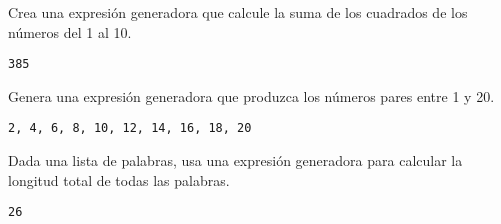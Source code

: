 \begin{exercise} Crea una expresión generadora que calcule la suma de los cuadrados de los números del 1 al 10.

\begin{Shaded}
\begin{Highlighting}[]
\OperatorTok{=} \OperatorTok{**}  \NormalTok{(}\NormalTok{, }\NormalTok{))}
\end{Highlighting}
\end{Shaded}

\begin{verbatim}
385

\end{verbatim}
\end{exercise}

\begin{exercise} Genera una expresión generadora que produzca los números pares entre 1 y 20.
\begin{Shaded}
\begin{Highlighting}[]
\OperatorTok{=} \NormalTok{(}\NormalTok{, }\NormalTok{) }\OperatorTok{\%}  \OperatorTok{==} \NormalTok{)}
\NormalTok{(}\OperatorTok{*}\OperatorTok{=}\NormalTok{)  }
\end{Highlighting}
\end{Shaded}

\begin{verbatim}
2, 4, 6, 8, 10, 12, 14, 16, 18, 20

\end{verbatim}
\end{exercise}

\begin{exercise} Dada una lista de palabras, usa una expresión generadora para calcular la longitud total de todas las palabras.

\begin{Shaded}
\begin{Highlighting}[]
\OperatorTok{=}\NormalTok{ [}\NormalTok{, }\NormalTok{, }\NormalTok{, }\NormalTok{]}
\OperatorTok{=} \NormalTok{(}
\end{Highlighting}
\end{Shaded}

\begin{verbatim}
26

\end{verbatim}
\end{exercise}

